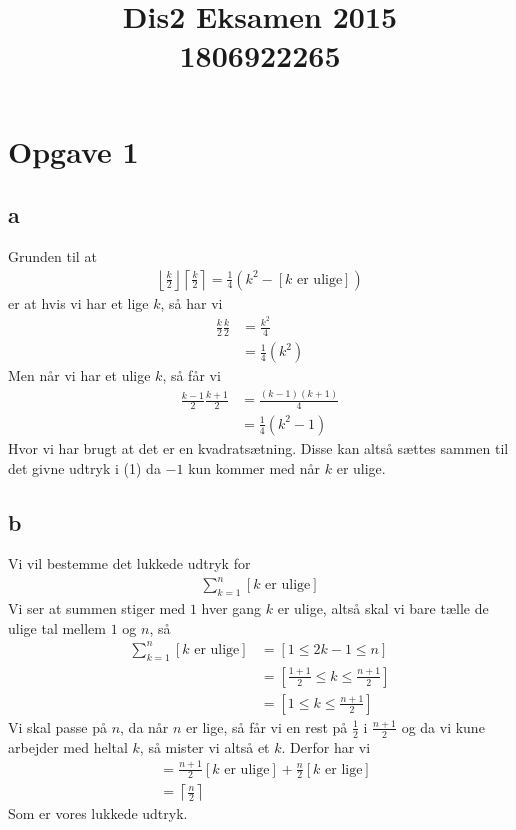 \documentclass[12pt]{article}
\title{Dis2 Eksamen 2015 \\ 1806922265}
\begin{document}
\maketitle
\section*{Opgave 1}
\subsection*{a}
Grunden til at
\begin{align}
\left\lfloor \frac{k}{2}\right\rfloor\left \lceil \frac{k}{2}\right\rceil =\frac{1}{4}(k^2-[k \mbox{ er ulige}])
\end{align}
er at hvis vi har et lige $k$, så har vi
\begin{align*}
\frac{k}{2}\frac{k}{2}&=\frac{k^2}{4} \\
&=\frac{1}{4}(k^2)
\end{align*}
Men når vi har et ulige $k$, så får vi
\begin{align*}
\frac{k-1}{2}\frac{k+1}{2}&=\frac{(k-1)(k+1)}{4} \\
&=\frac{1}{4}(k^2-1)
\end{align*}
Hvor vi har brugt at det er en kvadratsætning. Disse kan altså sættes sammen til det givne udtryk i (1) da $-1$ kun kommer med når $k$ er ulige.

\subsection*{b}
Vi vil bestemme det lukkede udtryk for
\begin{align*}
\sum_{k=1}^n [k \mbox{ er ulige}]
\end{align*}
Vi ser at summen stiger med $1$ hver gang $k$ er ulige, altså skal vi bare tælle de ulige tal mellem $1$ og $n$, så
\begin{align*}
\sum_{k=1}^n [k \mbox{ er ulige}] &= [1\leq 2k-1\leq n] \\
&=[\frac{1+1}{2}\leq k\leq \frac{n+1}{2}] \\
&=[1\leq k\leq \frac{n+1}{2}]
\end{align*}
Vi skal passe på $n$, da når $n$ er lige, så får vi en rest på $\frac{1}{2}$ i $\frac{n+1}{2}$ og da vi kune arbejder med heltal $k$, så mister vi altså et $k$. Derfor har vi
\begin{align*}
[1\leq k\leq \frac{n+1}{2}] &= \frac{n+1}{2}[k \mbox{ er ulige}]+\frac{n}{2}[k \mbox{ er lige}] \\
&=\left\lceil \frac{n}{2} \right\rceil
\end{align*}
Som er vores lukkede udtryk.
\end{document}
